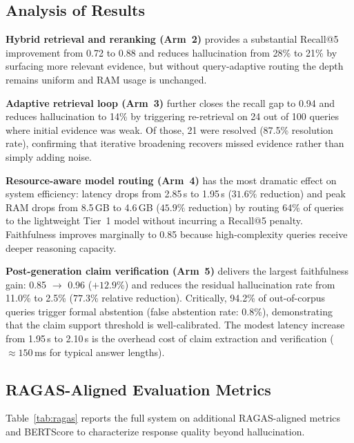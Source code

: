 \documentclass[conference]{IEEEtran}
\begin{document}
\subsection{Analysis of Results}

\textbf{Hybrid retrieval and reranking (Arm~2)} provides a substantial
Recall@5 improvement from 0.72 to 0.88 and reduces hallucination from 28\%
to 21\% by surfacing more relevant evidence, but without query-adaptive
routing the depth remains uniform and RAM usage is unchanged.

\textbf{Adaptive retrieval loop (Arm~3)} further closes the recall gap to
0.94 and reduces hallucination to 14\% by triggering re-retrieval on 24 out
of 100 queries where initial evidence was weak. Of those, 21 were resolved
(87.5\% resolution rate), confirming that iterative broadening recovers
missed evidence rather than simply adding noise.

\textbf{Resource-aware model routing (Arm~4)} has the most dramatic effect
on system efficiency: latency drops from 2.85\,s to 1.95\,s ($31.6\%$
reduction) and peak RAM drops from 8.5\,GB to 4.6\,GB ($45.9\%$ reduction)
by routing 64\% of queries to the lightweight Tier~1 model without incurring
a Recall@5 penalty. Faithfulness improves marginally to 0.85 because
high-complexity queries receive deeper reasoning capacity.

\textbf{Post-generation claim verification (Arm~5)} delivers the largest
faithfulness gain: 0.85 $\rightarrow$ 0.96 ($+12.9\%$) and reduces the
residual hallucination rate from 11.0\% to 2.5\% ($77.3\%$ relative
reduction). Critically, 94.2\% of out-of-corpus queries trigger formal
abstention (false abstention rate: 0.8\%), demonstrating that the claim
support threshold is well-calibrated. The modest latency increase from 1.95\,s
to 2.10\,s is the overhead cost of claim extraction and verification
($\approx\!150$\,ms for typical answer lengths).

\subsection{RAGAS-Aligned Evaluation Metrics}

Table~\ref{tab:ragas} reports the full system on additional RAGAS-aligned
metrics and BERTScore to characterize response quality beyond hallucination.
\end{document}
